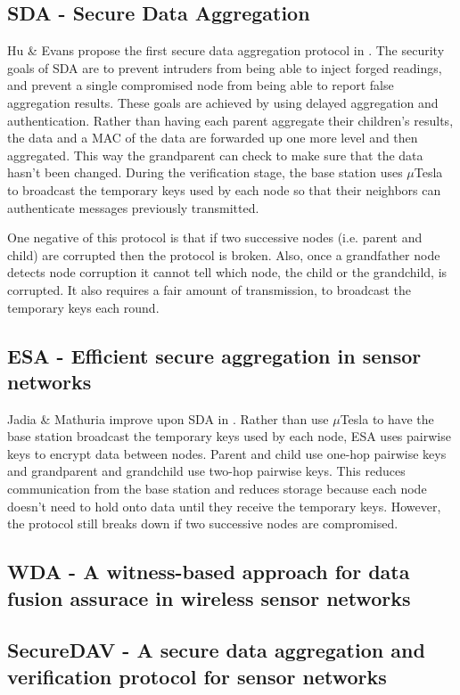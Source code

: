 \documentclass[a4paper]{article}
\begin{document}
\subsection{SDA - Secure Data Aggregation}

Hu \& Evans propose the first secure data aggregation protocol in
\cite{SDA}. The security goals of SDA are to prevent intruders from being able
to inject forged readings, and prevent a single compromised node from being
able to report false aggregation results. These goals are achieved by using
delayed aggregation and authentication. Rather than having each parent
aggregate their children's results, the data and a MAC of the data are
forwarded up one more level and then aggregated. This way the grandparent can
check to make sure that the data hasn't been changed. During the verification
stage, the base station uses $\mu$Tesla to broadcast the temporary keys used
by each node so that their neighbors can authenticate messages previously
transmitted.

One negative of this protocol is that if two successive nodes (i.e. parent and
child) are corrupted then the protocol is broken. Also, once a grandfather
node detects node corruption it cannot tell which node, the child or the
grandchild, is corrupted. It also requires a fair amount of transmission, to
broadcast the temporary keys each round.

\subsection{ESA - Efficient secure aggregation in sensor networks}
Jadia \& Mathuria improve upon SDA in \cite{ESA}. Rather than use $\mu$Tesla
to have the base station broadcast the temporary keys used by each node, ESA
uses pairwise keys to encrypt data between nodes. Parent and child use one-hop
pairwise keys and grandparent and grandchild use two-hop pairwise keys. This
reduces communication from the base station and reduces storage because each
node doesn't need to hold onto data until they receive the temporary
keys. However, the protocol still breaks down if two successive nodes are
compromised.

\subsection{WDA - A witness-based approach for data fusion assurace in wireless sensor networks}

\subsection{SecureDAV - A secure data aggregation and verification protocol for sensor networks}
\end{document}
